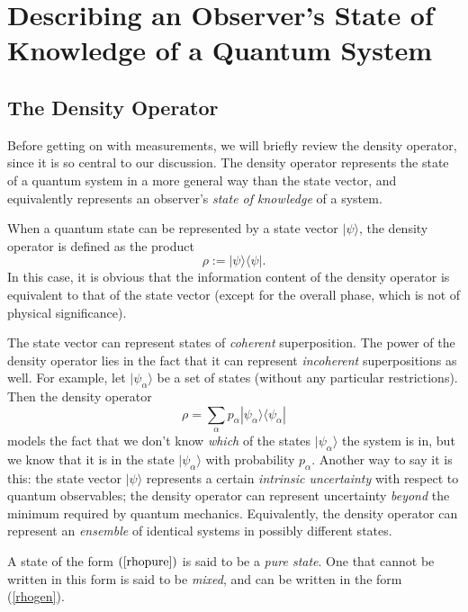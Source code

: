 \documentclass[12pt,aps,onecolum,superscriptaddress,footinbib,floatfix,showpacs]{revtex4-1}
\def\ket#1{|{#1}\rangle}
\def\bra#1{\langle{#1}|}
\begin{document}
\section{Describing an Observer's State of Knowledge of a Quantum System}
\label{section:basic}

\subsection{The Density Operator}

Before getting on with measurements, we will briefly review the density
operator, since it is so central to our discussion.
The density operator represents the state of a quantum system
in a more general way than the state vector, and equivalently
represents an observer's \textit{state of knowledge} of a system.

When a quantum state can be represented by a state vector $\ket\psi$,
the density operator is defined as the product
\begin{equation}
  \rho := \ket\psi\bra\psi.
  \label{rhopure}
\end{equation}
In this case, it is obvious that the information content
of the density operator is equivalent to that of the state vector
(except for the overall phase, which is not of physical significance).

The state vector can represent states of \textit{coherent} superposition.
The power of the density operator lies in the fact that it can 
represent \textit{incoherent} superpositions as well.
For example, let $\ket{\psi_\alpha}$ be a set of states (without any 
particular restrictions).  Then the density operator 
\begin{equation}
  \rho = \sum_\alpha p_\alpha \ket{\psi_\alpha}\bra{\psi_\alpha}
  \label{rhogen}
\end{equation}
models the fact that we don't know \textit{which} of the
states $\ket{\psi_\alpha}$ the system is in, but we know that
it is in the state $\ket{\psi_\alpha}$ with probability $p_\alpha$.
Another way to say it is this:
the state vector $\ket\psi$ represents a certain
\textit{intrinsic uncertainty} with respect to quantum observables;
the density operator can represent uncertainty \textit{beyond} the minimum
required by quantum mechanics.
Equivalently, the density operator can represent an \textit{ensemble}
of identical systems in possibly different states.

A state of the form $(\ref{rhopure})$ is said to be a \textit{pure state}.
One that cannot be written in this form is said
to be \textit{mixed}, and can be written in the form (\ref{rhogen}).
\end{document}
